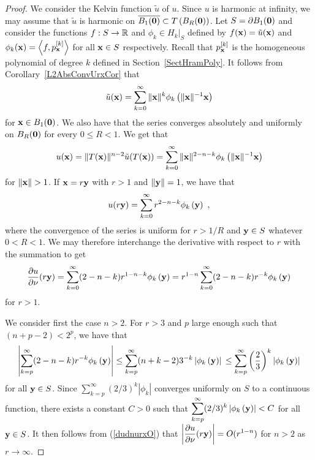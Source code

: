 \begin{proof}
We consider the Kelvin function $\tilde{u}$ of $u$.  Since $u$ is
harmonic at infinity, we may assume that
$\tilde{u}$ is harmonic on
$\displaystyle \overline{B_1(\mathbf{0})} \subset T\left(B_R(\mathbf{0})\right)$.
Let $S = \partial B_1(\mathbf{0})$ and consider the functions $f: S \to \mathbb{R}$
and $\displaystyle \phi_k \in H_k\big|_S$ defined by
$f(\mathbf{x}) = \tilde{u}(\mathbf{x})$ and
$\phi_k(\mathbf{x}) = \left\langle{f} , {p_{\mathbf{x}}^{[k]}}\right\rangle$ for all $\mathbf{x} \in S$
respectively.  Recall that $\displaystyle p_{\mathbf{x}}^{[k]}$ is the
homogeneous polynomial of degree $k$ defined in Section~\ref{SectHramPoly}.
It follows from Corollary~\ref{L2AbsConvUrxCor} that
\[
\tilde{u}(\mathbf{x}) = \sum_{k=0}^\infty \|\mathbf{x}\|^k
\phi_k\left(\|\mathbf{x}\|^{-1}\mathbf{x}\right)
\]
for $\mathbf{x} \in B_1(\mathbf{0})$.  We also have that the
series converges absolutely and uniformly on $B_R(\mathbf{0})$ for every
$0 \leq R <1$.   We get that
\[
u(\mathbf{x}) = \|T(\mathbf{x})\|^{n-2} \tilde{u}(T(\mathbf{x}))  
= \sum_{k=0}^\infty \|\mathbf{x}\|^{2-n-k}
\phi_k\left(\|\mathbf{x}\|^{-1} \mathbf{x}\right)
\]
for $\|\mathbf{x}\| > 1$.  If
$\mathbf{x} = r \mathbf{y}$ with $r > 1$ and $\|\mathbf{y}\|=1$, we have that
\[
u(r\mathbf{y}) = \sum_{k=0}^\infty r^{2-n-k} \phi_k\left(\mathbf{y}\right) \ ,
\]
where the convergence of the series is uniform for $r>1/R$ and
$\mathbf{y} \in S$ whatever $0 < R < 1$.  We may therefore interchange
the derivative with respect to $r$ with the summation to get
\begin{equation} \label{dudnurxO}
\frac{\partial{u}}{\partial \mathbf{\nu}}(r \mathbf{y})
= \sum_{k=0}^\infty (2-n-k) r^{1-n-k} \phi_k\left(\mathbf{y}\right)
= r^{1-n} \sum_{k=0}^\infty (2-n-k) r^{-k} \phi_k\left(\mathbf{y}\right)
\end{equation}
for $r>1$.

 We consider first the case $n>2$.  For $r>3$ and $p$ large
enough such that $\displaystyle (n+p-2) < 2^p$, we have that
\[
\left| \sum_{k=p}^{\infty} (2-n-k) r^{-k} \phi_k\left(\mathbf{y}\right) \right|
\leq \sum_{k=p}^{\infty} (n+k-2) 3^{-k}
\left| \phi_k\left(\mathbf{y}\right) \right| \\
\leq \sum_{k=p}^{\infty} \left(\frac{2}{3}\right)^k
\left| \phi_k\left(\mathbf{y}\right) \right|
\]
for all $\mathbf{y} \in S$.  Since
$\displaystyle \sum_{k=p}^{\infty} (2/3)^k |\phi_k|$
converges uniformly on $S$ to a continuous function, there exists a
constant $C>0$ such that
$\displaystyle \sum_{k=p}^{\infty} (2/3)^k \left|
  \phi_k\left(\mathbf{y}\right) \right| < C$
for all $\mathbf{y} \in S$.  It then follows
from (\ref{dudnurxO}) that
$\displaystyle \left| \frac{\partial{u}}{\partial \mathbf{\nu}}(r \mathbf{y}) \right| = O(r^{1-n})$
for $n>2$ as $r \to \infty$.


\end{proof}
